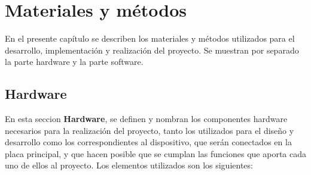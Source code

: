 \chapter{Materiales y métodos}
En el presente capítulo se describen los materiales y métodos utilizados para el desarrollo, implementación y realización del proyecto. Se muestran por separado la parte hardware y la parte software. 

\section{Hardware}
En esta seccion \textbf{Hardware}, se definen y nombran los componentes hardware necesarios para la realización del proyecto, tanto los utilizados para el diseño y desarrollo como los correspondientes al dispositivo, que serán conectados en la placa principal, y que hacen posible que se cumplan las funciones que aporta cada uno de ellos al proyecto. Los elementos utilizados son los siguientes:

